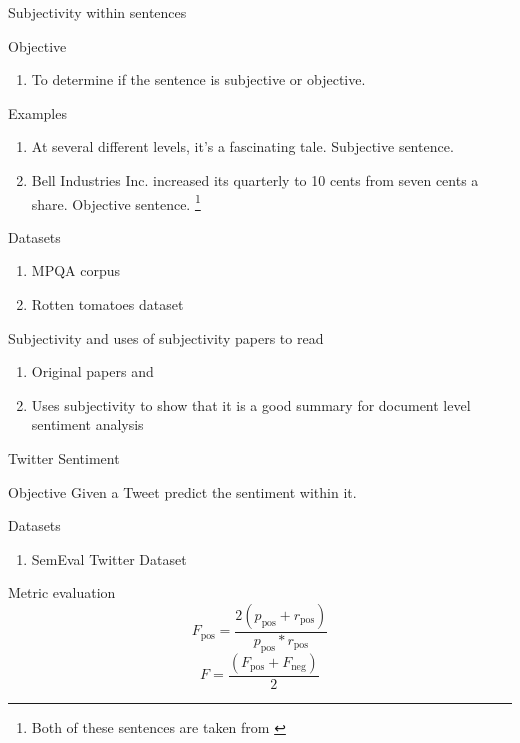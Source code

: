 \documentclass[10pt]{beamer}
\begin{document}
\begin{frame}{Subjectivity within sentences}
  \begin{block}{Objective}
    \begin{enumerate}
      \item To determine if the sentence is subjective or objective. 
    \end{enumerate}
  \end{block}
  \begin{block}{Examples}
    \begin{enumerate}
      \item At several different levels, it's a fascinating
tale. Subjective sentence.
      \item Bell Industries Inc. increased its quarterly
to 10 cents from seven cents a share. Objective
sentence. \footnote{Both of these sentences are taken from \cite{Wiebe99}}  
    \end{enumerate}
  \end{block}
  \begin{block}{Datasets}
    \begin{enumerate}
      \item MPQA corpus \cite{Deng15}
      \item Rotten tomatoes dataset \cite{PangSubj04}
    \end{enumerate}
  \end{block}
\end{frame}

\begin{frame}{Subjectivity and uses of subjectivity papers to read}
  \huge
  \begin{enumerate}
    \item Original papers \cite{Wiebe99} and \cite{Riloff03}
    \item Uses subjectivity to show that it is a good summary for document level sentiment analysis \cite{PangSubj04}
  \end{enumerate} 
\end{frame}

\begin{frame}{Twitter Sentiment}
  \begin{block}{Objective}
  Given a Tweet predict the sentiment within it.
  \end{block}
  \begin{block}{Datasets}
    \begin{enumerate}
      \item SemEval Twitter Dataset \cite{Nakov13}
    \end{enumerate}
  \end{block}
  \begin{block}{Metric evaluation}
    \begin{equation}
    F_\text{pos} = \frac{2(p_\text{pos} + r_\text{pos})}{p_\text{pos} * r_\text{pos}}
    \end{equation}
    \begin{equation}
    F = \frac{(F_\text{pos} + F_\text{neg})}{2}
    \end{equation}
  \end{block}
\end{frame}
\end{document}
